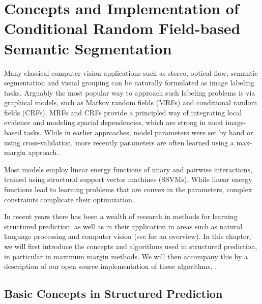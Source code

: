 \chapter{Concepts and Implementation of Conditional Random Field-based Semantic Segmentation}\label{ch:structured_pystruct}

Many classical computer vision applications such as stereo, optical flow, semantic
segmentation and visual grouping can be naturally formulated as image labeling tasks.
%
Arguably the most popular way to approach such labeling problems is via graphical
models, such as Markov random fields (MRFs) and conditional random fields (CRFs).
MRFs and CRFs provide a principled way of integrating local evidence and
modeling spacial dependencies, which are strong in most image-based tasks.
%
While in earlier approaches, model parameters were set by hand or using
cross-validation, more recently parameters are often learned using a max-margin
approach.

Most models employ linear energy functions of unary and pairwise interactions,
trained using structural support vector machines (SSVMs). While linear energy
functions lead to learning problems that are convex in the parameters, complex
constraints complicate their optimization. 

In recent years there has been a wealth of research in methods for learning
structured prediction, as well as in their application in areas such as natural
language processing and computer vision (see \citet{nowozin2011structured} for
an overview).
%
In this chapter, we will first introduce the concepts and algorithms used in
structured prediction, in particular in maximum margin methods. We will then
accompany this by a description of our open source implementation of these
algorithms, \pystruct.

\section{Basic Concepts in Structured Prediction}

